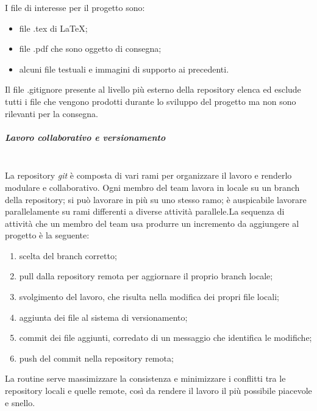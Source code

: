 			I file di interesse per il progetto sono:
			\begin{itemize}
				\item file .tex di \LaTeX{};
				\item file .pdf che sono oggetto di consegna;
				\item alcuni file testuali e immagini di supporto ai precedenti.
			\end{itemize}			
			Il file .gitignore presente al livello più esterno della repository elenca ed esclude tutti i file che vengono prodotti durante lo sviluppo del progetto ma non sono rilevanti per la consegna.
			\subparagraph{Lavoro collaborativo e versionamento} \mbox{}\\
			La repository \textit{git} è composta di vari rami per organizzare il lavoro e renderlo modulare e collaborativo. Ogni membro del team lavora in locale su un branch della repository; si può lavorare in più su uno stesso ramo; è auspicabile lavorare parallelamente su rami differenti a diverse attività parallele.\newline La sequenza di attività che un membro del team usa produrre un incremento da aggiungere al progetto è la seguente:
			\begin{enumerate}
				\item scelta del branch corretto;
				\item pull dalla repository remota per aggiornare il proprio branch locale;
				\item svolgimento del lavoro, che risulta nella modifica dei propri file locali;
				\item aggiunta dei file al sistema di versionamento;
				\item commit dei file aggiunti, corredato di un messaggio che identifica le modifiche;
				\item push del commit nella repository remota;
			\end{enumerate}
			La routine serve massimizzare la consistenza e minimizzare i conflitti tra le repository locali e quelle remote, così da rendere il lavoro il più possibile piacevole e snello.

